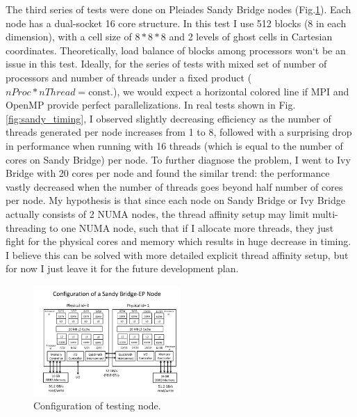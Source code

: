 \documentclass[fleqn,11pt]{SelfArx} %
\begin{document}
The third series of tests were done on Pleiades Sandy Bridge nodes (Fig.\ref{fig:sandy}). Each node has a dual-socket 16 core structure. In this test I use 512 blocks (8 in each dimension), with a cell size of $8*8*8$ and 2 levels of ghost cells in Cartesian coordinates. Theoretically, load balance of blocks among processors won`t be an issue in this test. Ideally, for the series of tests with mixed set of number of processors and number of threads under a fixed product ($nProc*nThread=\textrm{const.}$), we would expect a horizontal colored line if MPI and OpenMP provide perfect parallelizations. In real tests shown in Fig.\ref{fig:sandy_timing}, I observed slightly decreasing efficiency as the number of threads generated per node increases from 1 to 8, followed with a surprising drop in performance when running with 16 threads (which is equal to the number of cores on Sandy Bridge) per node. To further diagnose the problem, I went to Ivy Bridge with 20 cores per node and found the similar trend: the performance vastly decreased when the number of threads goes beyond half number of cores per node. My hypothesis is that since each node on Sandy Bridge or Ivy Bridge actually consists of 2 NUMA nodes, the thread affinity setup may limit multi-threading to one NUMA node, such that if I allocate more threads, they just fight for the physical cores and memory which results in huge decrease in timing. I believe this can be solved with more detailed explicit thread affinity setup, but for now I just leave it for the future development plan.  

\begin{figure}[htbp]
\centering
\includegraphics[width=0.5\textwidth]{figures/sandybridge_processor_numbering}
\caption{Configuration of testing node.}
\label{fig:sandy}
\end{figure}
\end{document}
